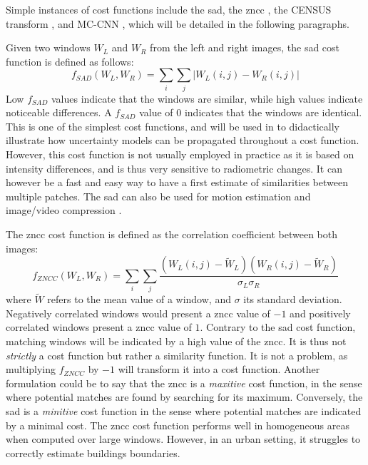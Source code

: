 \begin{example}\label{ex:cost_functions}
	Simple instances of cost functions include the \acrfull{sad}, the \acrfull{zncc} \cite{hannah_computer_1994}, the CENSUS transform \cite{zabih_non-parametric_1994}, and MC-CNN \cite{zbontar_stereo_2016}, which will be detailed in the following paragraphs.
	
	Given two windows $W_L$ and $W_R$ from the left and right images, the \acrshort{sad} cost function is defined as follows:
	\begin{equation}
		f_{SAD}(W_L, W_R)  = \sum_i\sum_j | W_L(i,j) - W_R(i,j) |
	\end{equation}
	Low $f_{SAD}$ values indicate that the windows are similar, while high values indicate noticeable differences. A $f_{SAD}$ value of $0$ indicates that the windows are identical. This is one of the simplest cost functions, and will be used in  to didactically illustrate how uncertainty models can be propagated throughout a cost function. However, this cost function is not usually employed in practice as it is based on intensity differences, and is thus very sensitive to radiometric changes. It can however be a fast and easy way to have a first estimate of similarities between multiple patches. The \acrshort{sad} can also be used for motion estimation and image/video compression \cite{richardson_h264_2006}.
	
	The \acrshort{zncc} cost function is defined as the correlation coefficient between both images:
	\begin{equation}
		f_{ZNCC}(W_L, W_R)  = \sum_i\sum_j \frac{(W_L(i,j)  - \tilde{W}_L) (W_R(i,j)  - \tilde{W}_R) }{\sigma_L\sigma_R}
	\end{equation}
	where $\tilde{W}$ refers to the mean value of a window, and $\sigma$ its standard deviation. Negatively correlated windows would present a \acrshort{zncc} value of $-1$ and positively correlated windows present a \acrshort{zncc} value of $1$. Contrary to the \acrshort{sad} cost function, matching windows will be indicated by a high value of the \acrshort{zncc}. It is thus not \textit{strictly} a cost function but rather a similarity function. It is not a problem, as multiplying $f_{ZNCC}$ by $-1$ will transform it into a cost function. Another formulation could be to say that the \acrshort{zncc} is a \textit{maxitive} cost function, in the sense where potential matches are found by searching for its maximum. Conversely, the \acrshort{sad} is a \textit{minitive} cost function in the sense where potential matches are indicated by a minimal cost. The \acrshort{zncc} cost function performs well in homogeneous areas when computed over large windows. However, in an urban setting, it struggles to correctly estimate buildings boundaries.
	

\end{example}
